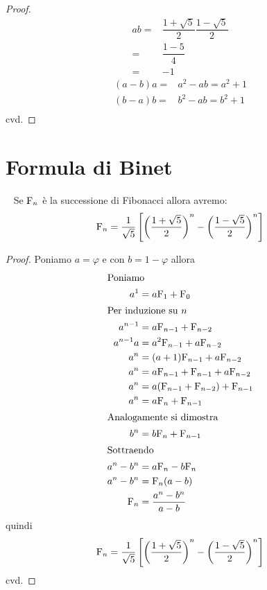 \begin{proof}
	\begin{align*}
		ab={}&\dfrac{1+\sqrt{5}}{2}\dfrac{1-\sqrt{5}}{2}\\
		={}&\dfrac{1-5}{4}\\
		={}&-1
	\end{align*}
	\begin{align*}
		(a-b)a={}&a^2-ab=a^2+1\\
		(b-a)b={}&b^2-ab=b^2+1\\
	\end{align*}
	cvd.
\end{proof}
\section{Formula di Binet}
\begin{thm}~\cite{Conti2020}\label{thm:FibFormulaBinet}
	Se $\mathrm{F}_{n}$ è la successione di Fibonacci allora avremo:
	\begin{equation}
		\mathrm{F}_{n}=\dfrac{1}{\sqrt{5}}\left[\left(\dfrac{1+\sqrt{5}}{2}\right)^n-\left(\dfrac{1-\sqrt{5}}{2}\right)^n\right]
	\end{equation}\label{eqn:FinBinet}
\end{thm}
\begin{proof}
	Poniamo $a=\varphi$ e con $b=1-\varphi$ allora
	\begin{align*}
		\intertext{Poniamo}
		a^1={}&a\mathrm{F}_{1}+\mathrm{F}_{0}\\
		\intertext{Per induzione su $n$}
		a^{n-1}={}&a\mathrm{F}_{n-1}+\mathrm{F}_{n-2}\\
		a^{n-1}a={}&a^2\mathrm{F}_{n-1}+a\mathrm{F}_{n-2}\\
		a^{n}={}&(a+1)\mathrm{F}_{n-1}+a\mathrm{F}_{n-2}\\
		a^{n}={}&a\mathrm{F}_{n-1}+\mathrm{F}_{n-1}+a\mathrm{F}_{n-2}\\
		a^{n}={}&a(\mathrm{F}_{n-1}+\mathrm{F}_{n-2})+\mathrm{F}_{n-1}\\
		a^{n}={}&a\mathrm{F}_{n}+\mathrm{F}_{n-1}\\
		\intertext{Analogamente si dimostra}
		b^{n}={}&b\mathrm{F}_{n}+\mathrm{F}_{n-1}\\
		\intertext{Sottraendo}
		a^n-b^n={}&a\mathrm{F}_{n}-b\mathrm{F}_{n}\\
		a^n-b^n={}&\mathrm{F}_{n}(a-b)\\
		\mathrm{F}_{n}={}&\dfrac{a^n-b^n}{a-b}
	\end{align*}
quindi
\begin{equation}
\mathrm{F}_{n}=\dfrac{1}{\sqrt{5}}\left[\left(\dfrac{1+\sqrt{5}}{2}\right)^n-\left(\dfrac{1-\sqrt{5}}{2}\right)^n\right]
\end{equation}
cvd.
\end{proof}
